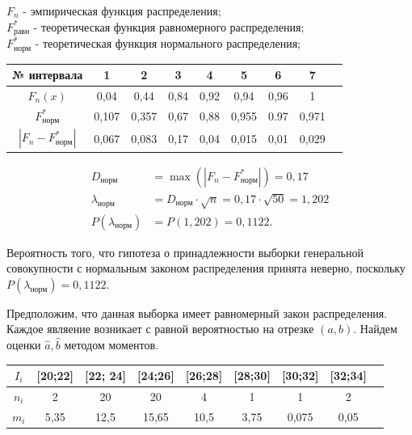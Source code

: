 \documentclass[utf8, a4paper, 14pt, russian, oneside]{book}
\begin{document}
$F_n$ - эмпирическая функция распределения;\\
$F^*_{\text{равн}}$ - теоретическая функция равномерного распределения;\\
$F^*_{\text{норм}}$ - теоретическая функция нормального распределения;

\begin{table}[h!]
    \centering
    \begin{tabular}{|c|c|c|c|c|c|c|c|c|}
        \hline
        № интервала & 1 & 2 & 3 & 4 & 5 & 6 & 7 \\
        \hline
        $F_n(x)$ & 0,04 & 0,44 & 0,84 & 0,92 & 0,94 & 0,96 & 1 \\
        \hline
        $F^*_{\text{норм}}$ & 0,107 & 0,357 & 0,67 & 0,88 & 0,955 & 0.97 & 0,971 \\
        \hline
        $| F_n - F^*_{\text{норм}} |$ & 0,067 & 0,083 & 0,17 & 0,04 & 0,015 & 0,01 & 0,029\\
        \hline
    \end{tabular}
\end{table}
\begin{align*}
    D_{\text{норм}} &= \max{(|F_n - F^*_{\text{норм}}|)} = 0,17 \\
    \lambda_{\text{норм}} &= D_{\text{норм}} \cdot \sqrt{n} = 0,17 \cdot \sqrt{50} = 1,202\\
    P(\lambda_{\text{норм}}) &= P(1,202) = 0,1122.
\end{align*}

Вероятность того, что гипотеза о принадлежности выборки генеральной совокупности с нормальным законом распределения принята неверно, поскольку $P(\lambda_{\text{норм}}) = 0,1122$.
\newpage


Предположим, что данная выборка имеет равномерный закон распределения.
Каждое являение возникает с равной вероятностью на отрезке $(a, b)$. Найдем оценки $\hat a, \hat b$ методом моментов.
\begin{table}[h!]
    \centering
    \begin{tabular}{|c|c|c|c|c|c|c|c|c|}
        \hline
        $I_i$  & [20;22] & [22; 24] & [24;26] & [26;28] & [28;30] & [30;32] & [32;34] \\
        \hline
        $n_i$ & 2 & 20 & 20 & 4 & 1 & 1 & 2 \\
        \hline
        $m_i$ & 5,35 & 12,5 & 15,65 & 10,5 & 3,75 & 0,075 & 0,05\\
        \hline
    \end{tabular}
\end{table}
\end{document}

